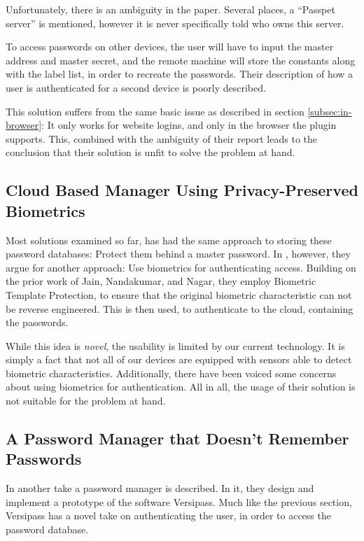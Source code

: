 			Unfortunately, there is an ambiguity in the paper. Several places, a ``Passpet server'' is mentioned, however it is never specifically told who owns this server. 

			To access passwords on other devices, the user will have to input the master address and master secret, and the remote machine will store the constants along with the label list, in order to recreate the passwords. Their description of how a user is authenticated for a second device is poorly described.

			This solution suffers from the same basic issue as described in section \ref{subsec:in-browser}: It only works for website logins, and only in the browser the plugin supports. This, combined with the ambiguity of their report leads to the conclusion that their solution is unfit to solve the problem at hand.

		\subsection*{Cloud Based Manager Using Privacy-Preserved Biometrics}
			Most solutions examined so far, has had the same approach to storing these password databases: Protect them behind a master password. In \cite{busch2014}, however, they argue for another approach: Use biometrics for authenticating access. Building on the prior work of Jain, Nandakumar, and Nagar, they employ Biometric Template Protection, to ensure that the original biometric characteristic can not be reverse engineered. This is then used, to authenticate to the cloud, containing the passwords.


			While this idea is \emph{novel}, the usability is limited by our current technology. It is simply a fact that not all of our devices are equipped with sensors able to detect biometric characteristics. Additionally, there have been voiced some concerns about using biometrics for authentication. All in all, the usage of their solution is not suitable for the problem at hand.

		\subsection*{A Password Manager that Doesn't Remember Passwords}
			In \cite{stobert2014} another take a password manager is described. In it, they design and implement a prototype of the software Versipass. Much like the previous section, Versipass has a novel take on authenticating the user, in order to access the password database.

